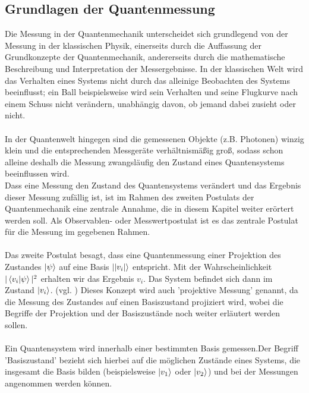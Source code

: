 \subsection{Grundlagen der Quantenmessung}
\label{subsec: Grundlagen der Quantenmessung}

Die Messung in der Quantenmechanik unterscheidet sich grundlegend von der Messung in der klassischen Physik, einerseits durch die Auffassung der Grundkonzepte der Quantenmechanik, andererseits durch die mathematische Beschreibung und Interpretation der Messergebnisse.
In der klassischen Welt wird das Verhalten eines Systems nicht durch das alleinige Beobachten des Systems beeinflusst; ein Ball beispielsweise wird sein Verhalten und seine Flugkurve nach einem Schuss nicht verändern, unabhängig davon, ob jemand dabei zusieht oder nicht. \\
\\
In der Quantenwelt hingegen sind die gemessenen Objekte (z.B. Photonen) winzig klein und die entsprechenden Messgeräte verhältnismäßig groß, sodass schon alleine deshalb die Messung zwangsläufig den Zustand eines Quantensystems beeinflussen wird. \\
Dass eine Messung den Zustand des Quantensystems verändert und das Ergebnis dieser Messung zufällig ist, ist im Rahmen des zweiten Postulats der Quantenmechanik eine zentrale Annahme, die in diesem Kapitel weiter erörtert werden soll. Als Observablen- oder Messwertpostulat ist es das zentrale Postulat für die Messung im gegebenen Rahmen. \\
\\
Das zweite Postulat besagt, dass eine Quantenmessung einer Projektion des Zustandes $\ket{\psi}$ auf eine Basis $\ket{|v_i|}$ entspricht. Mit der Wahrscheinlichkeit $|\braket{v_i|\psi}|^2$ erhalten wir das Ergebnis $v_i$. Das System befindet sich dann im Zustand $\ket{v_i}$. 
(vgl. \cite[Ch. 1.4.1]{lvovsky_quantum_2018}) 
\newline Dieses Konzept wird auch 'projektive Messung' genannt, da die Messung des Zustandes auf einen Basiszustand projiziert wird, wobei die Begriffe der Projektion und der Basiszustände noch weiter erläutert werden sollen. \\
\\
Ein Quantensystem wird innerhalb einer bestimmten Basis gemessen.Der Begriff 'Basiszustand' bezieht sich hierbei auf die möglichen Zustände eines Systems, die insgesamt die Basis bilden (beispielsweise $\ket{v_1}$ oder $\ket{v_2}$) und bei der Messungen angenommen werden können.
